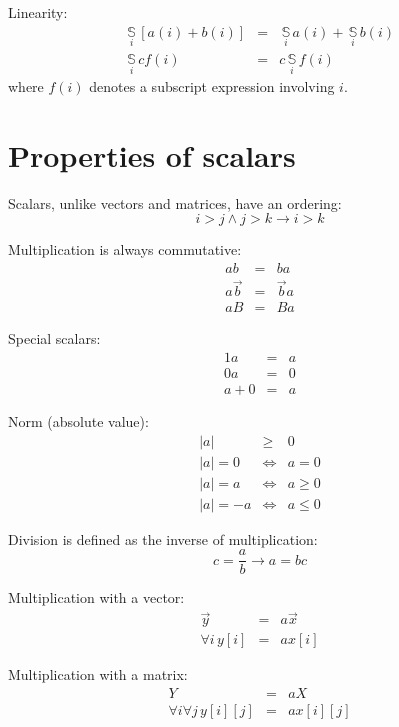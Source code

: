 \documentclass{article}
\newcommand{\summation}[1]{\underset{#1}{\,\mathbb{S}\,}}
\begin{document}
Linearity:
\begin{eqnarray}
	\summation{i} \left [ a(i) + b(i) \right ] & = & \summation{i} a(i) + \summation{i} b(i) \\
	\summation{i} c f(i) & = & c \summation{i} f(i)
\end{eqnarray}
where $f(i)$ denotes a subscript expression involving $i$.


\section{Properties of scalars}

Scalars, unlike vectors and matrices, have an ordering:
\begin{equation}
	i > j \land j > k \rightarrow i > k
\end{equation}

Multiplication is always commutative:
\begin{eqnarray}
	a b & = & b a \\
	a \vec b & = & \vec b a \\
	a B & = & B a
\end{eqnarray}

Special scalars:
\begin{eqnarray}
	1 a & = & a \\
	0 a & = & 0 \\
	a + 0 & = & a
\end{eqnarray}

Norm (absolute value):
\begin{eqnarray}
	| a | & \ge & 0 \\
	| a | = 0 & \iff & a=0 \\
	| a | = a & \iff & a \ge 0 \\
	| a | = -a & \iff & a \le 0
\end{eqnarray}

Division is defined as the inverse of multiplication:
\begin{equation}
	c = \frac{a}{b} \rightarrow a = b c
\end{equation}

Multiplication with a vector:
\begin{eqnarray}
	\vec y & = & a \vec x \\
	\forall i\, y[i] & = & a x[i]
\end{eqnarray}

Multiplication with a matrix:
\begin{eqnarray}
	Y & = & a X \\
	\forall i \forall j \, y[i][j] & = & a x[i][j]
\end{eqnarray}
\end{document}
